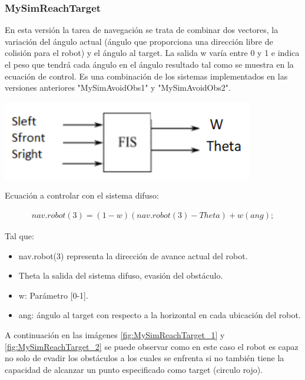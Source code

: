 \subsubsection{MySimReachTarget}

En esta versión la tarea de navegación se trata de combinar dos vectores, la variación del ángulo actual (ángulo que proporciona una dirección libre de colisión para el robot) y el ángulo al target. La salida w varía entre 0 y 1 e indica el peso que tendrá cada ángulo en el ángulo resultado tal como se muestra en la ecuación de control. Es una combinación de los sistemas implementados en las versiones anteriores "MySimAvoidObs1" y "MySimAvoidObs2".


\begin{center}
    \includegraphics[scale=0.5]{Tesis/Capitulos/04_CAPITULO_2/img/esquema2.png}
\end{center}

Ecuación a controlar con el sistema difuso:

\begin{equation}\boxed{
\begin{array}{rcl}
nav.robot(3)=(1-w)(nav.robot(3)-Theta) + w(ang);
\end{array}}
\end{equation}

Tal que:

\begin{itemize}
    \item nav.robot(3) representa la dirección de avance actual del robot.
    \item Theta la salida del sistema difuso, evasión del obstáculo.
    \item w: Parámetro [0-1].
    \item ang: ángulo al target con respecto a la horizontal en cada ubicación del robot.
\end{itemize}

A continuación en las imágenes \ref{fig:MySimReachTarget_1} y \ref{fig:MySimReachTarget_2} se puede observar como en este caso el robot es capaz no solo de evadir los obstáculos a los cuales se enfrenta si no también tiene la capacidad de alcanzar un punto especificado como target (circulo rojo).

